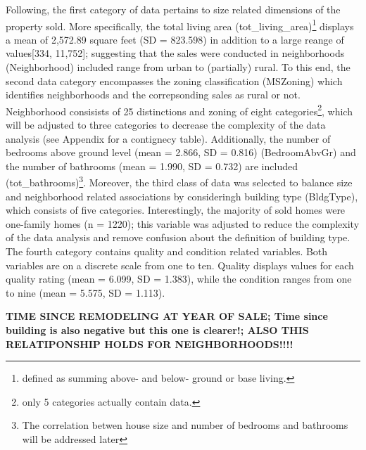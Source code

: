 \documentclass{article}
\begin{document}
\indent Following, the first category of data pertains to size related dimensions of the property sold. More specifically, the total living area (tot\_living\_area)\footnote{defined as summing above- and below- ground or base living.} displays a mean of 2,572.89 square feet (SD = 823.598) in addition to a large reange of values[334, 11,752]; suggesting that the sales were conducted in neighborhoods (Neighborhood) included range from urban to (partially) rural. To this end, the second data category encompasses the zoning classification (MSZoning) which identifies neighborhoods and the correpsonding sales as rural or not. Neighborhood consisists of 25 distinctions and zoning of eight categories\footnote{only 5 categories actually contain data.}, which will be adjusted to three categories to decrease the complexity of the data analysis (see Appendix for a contignecy table). Additionally, the number of bedrooms above ground level (mean = 2.866, SD = 0.816) (BedroomAbvGr) and the number of bathrooms (mean = 1.990, SD = 0.732) are included (tot\_bathrooms)\footnote{The correlation betwen house size and number of bedrooms and bathrooms will be addressed later}. 
\indent Moreover, the third class of data was selected to balance size and neighborhood related associations by consideringh building type (BldgType), which consists of five categories. Interestingly, the majority of sold homes were one-family homes (n = 1220); this variable was adjusted to reduce the complexity of the data analysis and remove confusion about the definition of building type.
\indent The fourth category contains quality and condition related variables. Both variables are on a discrete  scale from one to ten. Quality displays values for each quality rating (mean = 6.099, SD = 1.383), while the condition ranges from one to nine (mean = 5.575, SD = 1.113).

\textbf{TIME SINCE REMODELING AT YEAR OF SALE; Time since building is also negative but this one is clearer!; ALSO THIS RELATIPONSHIP HOLDS FOR NEIGHBORHOODS!!!!}
 
\end{document}
